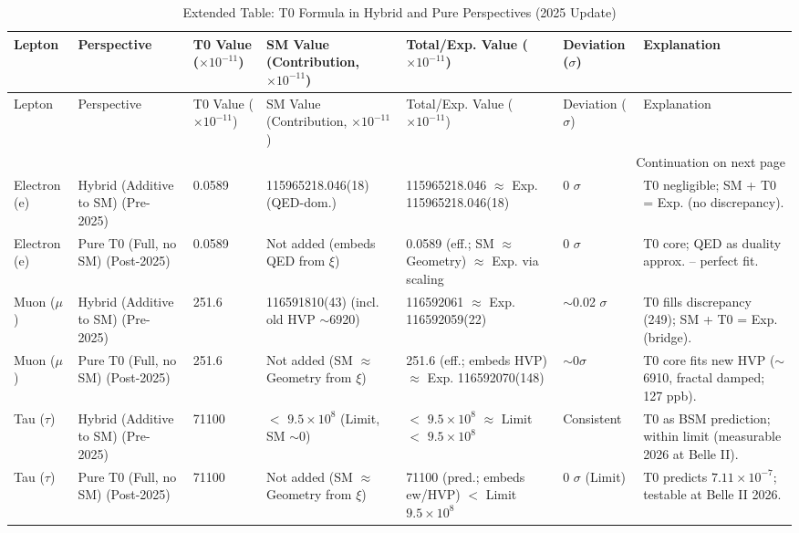 \documentclass[12pt,a4paper]{article}
\begin{document}
	\begin{longtable}{p{1.5cm}p{2cm}p{1.4cm}p{3cm}p{3cm}p{1.5cm}p{2.5cm}}
		\caption{Extended Table: T0 Formula in Hybrid and Pure Perspectives (2025 Update)} \label{tab:extended_comparison}\\
		\toprule
		Lepton & Perspective & T0 Value ($ \times 10^{-11}$) & SM Value (Contribution, $ \times 10^{-11}$) & Total/Exp. Value ($ \times 10^{-11}$) & Deviation ($\sigma$) & Explanation \\
		\midrule
		\endfirsthead
		
		\toprule
		Lepton & Perspective & T0 Value ($ \times 10^{-11}$) & SM Value (Contribution, $ \times 10^{-11}$) & Total/Exp. Value ($ \times 10^{-11}$) & Deviation ($\sigma$) & Explanation \\
		\midrule
		\endhead
		
		\bottomrule
		\multicolumn{7}{r}{Continuation on next page} \\
		\endfoot
		
		Electron (e) & Hybrid (Additive to SM) (Pre-2025) & 0.0589 & 115965218.046(18) (QED-dom.) & 115965218.046 $\approx$ Exp. 115965218.046(18) & 0 $\sigma$ & T0 negligible; SM + T0 = Exp. (no discrepancy). \\
		Electron (e) & Pure T0 (Full, no SM) (Post-2025) & 0.0589 & Not added (embeds QED from $\xi$) & 0.0589 (eff.; SM $\approx$ Geometry) $\approx$ Exp. via scaling & 0 $\sigma$ & T0 core; QED as duality approx. -- perfect fit. \\
		Muon ($\mu$) & Hybrid (Additive to SM) (Pre-2025) & 251.6 & 116591810(43) (incl. old HVP $\sim$6920) & 116592061 $\approx$ Exp. 116592059(22) & $\sim$0.02 $\sigma$ & T0 fills discrepancy (249); SM + T0 = Exp. (bridge). \\
		Muon ($\mu$) & Pure T0 (Full, no SM) (Post-2025) & 251.6 & Not added (SM $\approx$ Geometry from $\xi$) & 251.6 (eff.; embeds HVP) $\approx$ Exp. 116592070(148) & $\sim 0 \sigma$ & T0 core fits new HVP ($\sim$6910, fractal damped; 127 ppb). \\
		Tau ($\tau$) & Hybrid (Additive to SM) (Pre-2025) & 71100 & $<$ $9.5 \times 10^{8}$ (Limit, SM $\sim$0) & $<$ $9.5 \times 10^{8}$ $\approx$ Limit $<$ $9.5 \times 10^{8}$ & Consistent & T0 as BSM prediction; within limit (measurable 2026 at Belle II). \\
		Tau ($\tau$) & Pure T0 (Full, no SM) (Post-2025) & 71100 & Not added (SM $\approx$ Geometry from $\xi$) & 71100 (pred.; embeds ew/HVP) $<$ Limit $9.5 \times 10^{8}$ & 0 $\sigma$ (Limit) & T0 predicts $7.11 \times 10^{-7}$; testable at Belle II 2026. \\
	\end{longtable}
	
\end{document}
